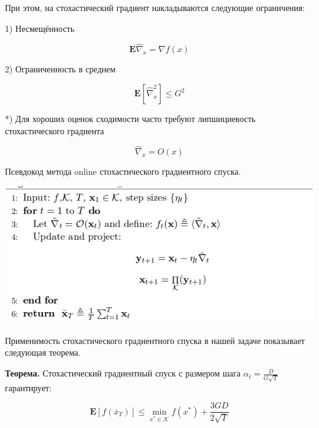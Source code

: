 \documentclass[12pt]{article}
\begin{document}
При этом, на стохастический градиент накладываются следующие ограничения:
   
1) Несмещённость

   $$\textbf{E}\widehat{\nabla}_x = \nabla f(x)$$
   
2) Ограниченность в среднем

   $$\textbf{E}[\widehat{\nabla}_x^2] \leq G^2$$

*) Для хороших оценок сходимости часто требуют липшициевость стохастического градиента

   $$\widehat{\nabla}_x = O(x)$$

Псевдокод метода online стохастического градиентного спуска.

\includegraphics[width=\linewidth]{SGD_algo.png}

Применимость стохастического градиентного спуска в нашей задаче показывает следующая теорема.

\textbf{Теорема.} Стохастический градиентный спуск с размером шага $\alpha_t = \frac{D}{G\sqrt{T}}$ гарантирует:

$$\textbf{E}[f(\overline{x}_T)] \leq \min\limits_{x^* \in \mathcal{K}} f(x^*) + \frac{3GD}{2\sqrt{T}}$$
\end{document}
